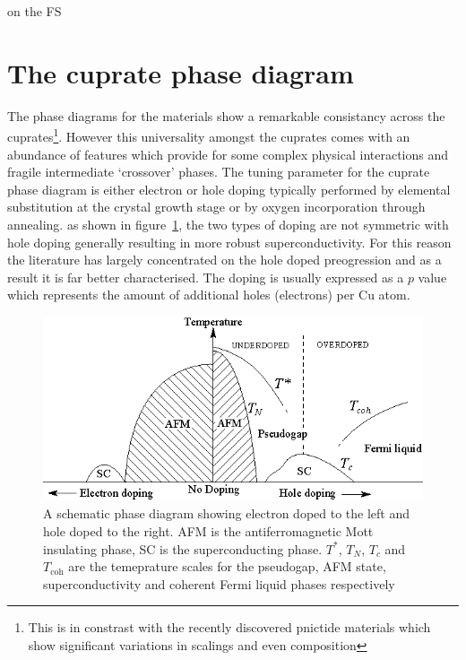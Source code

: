  on the FS
\section{The cuprate phase diagram}

The phase diagrams for the \highTc materials show a remarkable consistancy across the cuprates\footnote{This is in constrast with the recently discovered pnictide materials which show significant variations in scalings and even composition}. However this universality amongst the cuprates comes with an abundance of features which provide for some complex physical interactions and fragile intermediate `crossover' phases. The tuning parameter for the cuprate phase diagram is either electron or hole doping typically performed by elemental substitution at the crystal growth stage or by oxygen incorporation through annealing. as shown in figure~\ref{Fig:Intro:ElecHolePhaseDiagram}, the two types of doping are not symmetric with hole doping generally resulting in more robust superconductivity. For this reason the literature has largely concentrated on the hole doped preogression and as a result it is far better characterised. The doping is usually expressed as a $p$ value which represents the amount of additional holes (electrons) per Cu atom.
\begin{figure}[htbp]
    \begin{center}
        \includegraphics[scale=0.9]{Chapter-Introduction/Figures/ElecHolePhaseDiagram/ElecHolePhaseDiagram}
        \caption{A schematic phase diagram showing electron doped to the left and hole doped to the right. AFM is the antiferromagnetic Mott insulating phase, SC is the superconducting phase. $T^*$, $T_N$, $T_c$ and $T_{\textrm{coh}}$ are the temeprature scales for the pseudogap, AFM state, superconductivity and coherent Fermi liquid phases respectively}
        \label{Fig:Intro:ElecHolePhaseDiagram}
    \end{center}
\end{figure}

